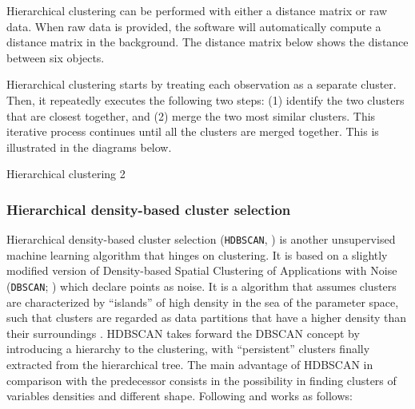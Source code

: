 \documentclass[fleqn,usenatbib]{mnras}
\begin{document}
Hierarchical clustering can be performed with either a distance matrix or raw data.
When raw data is provided, the software will automatically compute a distance
matrix in the background. The distance matrix below shows the distance between
six objects.

Hierarchical clustering starts by treating each observation as a separate cluster.
Then, it repeatedly executes the following two steps: (1) identify the two
clusters that are closest together, and (2) merge the two most similar clusters.
This iterative process continues until all the clusters are merged together.
This is illustrated in the diagrams below.

Hierarchical clustering 2

\subsubsection{Hierarchical density-based cluster selection}
\label{sec:hdbscan}

Hierarchical density-based cluster selection (\texttt{HDBSCAN}, \citealp{Campello:2013})
is another unsupervised machine learning algorithm that hinges on clustering.
It is based on a slightly modified version of Density-based Spatial
Clustering of Applications with Noise (\texttt{DBSCAN}; \citealp{Ester:1996}) which
declare points as noise. It is a algorithm that assumes clusters are characterized
by ``islands'' of high density in the sea of the parameter space, such
that clusters are regarded as data partitions that have a higher density
than their surroundings \citep{Ntwaetsile:2021}. HDBSCAN takes forward the
DBSCAN concept by introducing a hierarchy to the clustering, with ``persistent''
clusters finally extracted from the hierarchical tree. The main advantage of
HDBSCAN in comparison with the predecessor consists in the possibility in finding
clusters of variables densities and different shape. Following \citet{Malzer:2021}
and \citet{Ntwaetsile:2021} works as follows:
\end{document}

